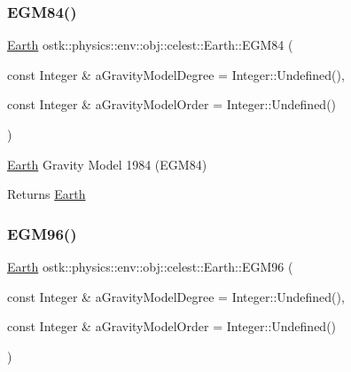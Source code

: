 \subsubsection{\texorpdfstring{E\+G\+M84()}{EGM84()}}
{\footnotesize\ttfamily \hyperlink{classostk_1_1physics_1_1env_1_1obj_1_1celest_1_1_earth}{Earth} ostk\+::physics\+::env\+::obj\+::celest\+::\+Earth\+::\+E\+G\+M84 (\begin{DoxyParamCaption}\item[{const Integer \&}]{a\+Gravity\+Model\+Degree = {\ttfamily Integer\+:\+:Undefined()},  }\item[{const Integer \&}]{a\+Gravity\+Model\+Order = {\ttfamily Integer\+:\+:Undefined()} }\end{DoxyParamCaption})\hspace{0.3cm}{\ttfamily [static]}}



\hyperlink{classostk_1_1physics_1_1env_1_1obj_1_1celest_1_1_earth}{Earth} Gravity Model 1984 (E\+G\+M84) 

\begin{DoxyReturn}{Returns}
\hyperlink{classostk_1_1physics_1_1env_1_1obj_1_1celest_1_1_earth}{Earth} 
\end{DoxyReturn}
\mbox{\label{classostk_1_1physics_1_1env_1_1obj_1_1celest_1_1_earth_a51931a35af7457fef1e23055d23646f2}} 
\subsubsection{\texorpdfstring{E\+G\+M96()}{EGM96()}}
{\footnotesize\ttfamily \hyperlink{classostk_1_1physics_1_1env_1_1obj_1_1celest_1_1_earth}{Earth} ostk\+::physics\+::env\+::obj\+::celest\+::\+Earth\+::\+E\+G\+M96 (\begin{DoxyParamCaption}\item[{const Integer \&}]{a\+Gravity\+Model\+Degree = {\ttfamily Integer\+:\+:Undefined()},  }\item[{const Integer \&}]{a\+Gravity\+Model\+Order = {\ttfamily Integer\+:\+:Undefined()} }\end{DoxyParamCaption})\hspace{0.3cm}{\ttfamily [static]}}




